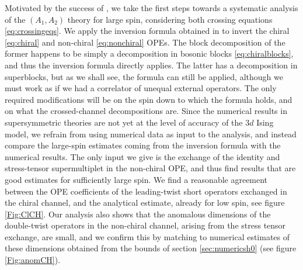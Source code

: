 \medskip


Motivated by the success of \cite{Simmons-Duffin:2016wlq}, we take the first steps towards a systematic analysis of the $(A_1,A_2)$ theory for large spin, considering both crossing equations \eqref{eq:crossingeqs}.
We apply the inversion formula obtained in \cite{Caron-Huot:2017vep}  to invert the chiral \eqref{eq:chiral} and non-chiral \eqref{eq:nonchiral} OPEs. The block decomposition of the former happens to be simply a decomposition in bosonic blocks \eqref{eq:chiralblocks}, and thus the inversion formula directly applies. The latter has a decomposition in superblocks, but as we shall see, the formula can still be applied, although we must work as if we had a correlator of unequal external operators. The only required modifications will be on the spin down to which the formula holds, and on what the crossed-channel decompositions are.
Since the numerical results in supersymmetric theories are not yet at the level of accuracy of the $3d$ Ising model, we refrain from using numerical data as input to the analysis, and instead compare the large-spin estimates coming from the inversion formula with the numerical results. The only input we give is the exchange of the identity and stress-tensor supermultiplet in the non-chiral OPE, and thus find results that are good estimates for sufficiently large spin. We find a reasonable agreement between the OPE coefficients of the leading-twist short operators exchanged in the chiral channel, and the analytical estimate, already for low spin, see figure \ref{Fig:ClCH}. Our analysis also shows that the anomalous dimensions of the double-twist operators in the non-chiral channel, arising from the stress tensor exchange, are small, and we confirm this by matching to numerical estimates of these dimensions obtained from the bounds of section \ref{sec:numericsh0} (see figure \ref{Fig:anomCH}).



